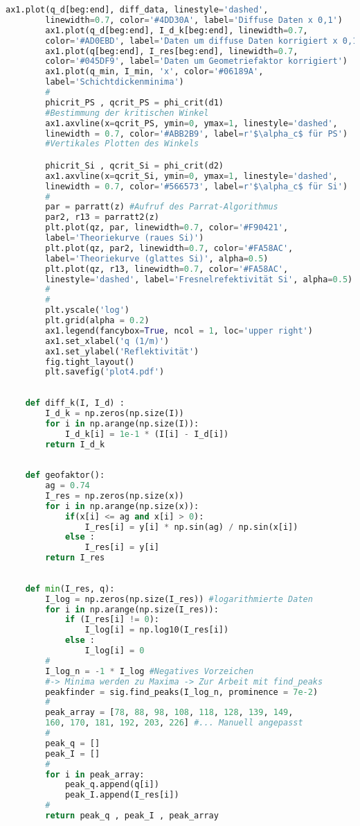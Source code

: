 \begin{lstlisting}[language=Python]
        ax1.plot(q_d[beg:end], diff_data, linestyle='dashed', 
        linewidth=0.7, color='#4DD30A', label='Diffuse Daten x 0,1')
        ax1.plot(q_d[beg:end], I_d_k[beg:end], linewidth=0.7, 
        color='#AD0EBD', label='Daten um diffuse Daten korrigiert x 0,1')
        ax1.plot(q[beg:end], I_res[beg:end], linewidth=0.7, 
        color='#045DF9', label='Daten um Geometriefaktor korrigiert')
        ax1.plot(q_min, I_min, 'x', color='#06189A', 
        label='Schichtdickenminima')
        #
        phicrit_PS , qcrit_PS = phi_crit(d1) 
        #Bestimmung der kritischen Winkel
        ax1.axvline(x=qcrit_PS, ymin=0, ymax=1, linestyle='dashed', 
        linewidth = 0.7, color='#ABB2B9', label=r'$\alpha_c$ für PS') 
        #Vertikales Plotten des Winkels

        phicrit_Si , qcrit_Si = phi_crit(d2)
        ax1.axvline(x=qcrit_Si, ymin=0, ymax=1, linestyle='dashed', 
        linewidth = 0.7, color='#566573', label=r'$\alpha_c$ für Si')
        #
        par = parratt(z) #Aufruf des Parrat-Algorithmus
        par2, r13 = parratt2(z)
        plt.plot(qz, par, linewidth=0.7, color='#F90421',
        label='Theoriekurve (raues Si)')
        plt.plot(qz, par2, linewidth=0.7, color='#FA58AC',
        label='Theoriekurve (glattes Si)', alpha=0.5)
        plt.plot(qz, r13, linewidth=0.7, color='#FA58AC',
        linestyle='dashed', label='Fresnelrefektivität Si', alpha=0.5)
        #
        #
        plt.yscale('log')
        plt.grid(alpha = 0.2)
        ax1.legend(fancybox=True, ncol = 1, loc='upper right')
        ax1.set_xlabel('q (1/m)')
        ax1.set_ylabel('Reflektivität')
        fig.tight_layout()
        plt.savefig('plot4.pdf')
    
    
    def diff_k(I, I_d) :
        I_d_k = np.zeros(np.size(I))
        for i in np.arange(np.size(I)):
            I_d_k[i] = 1e-1 * (I[i] - I_d[i])
        return I_d_k
    
    
    def geofaktor():
        ag = 0.74
        I_res = np.zeros(np.size(x))
        for i in np.arange(np.size(x)):
            if(x[i] <= ag and x[i] > 0):
                I_res[i] = y[i] * np.sin(ag) / np.sin(x[i])
            else :
                I_res[i] = y[i]
        return I_res
    
    
    def min(I_res, q):
        I_log = np.zeros(np.size(I_res)) #logarithmierte Daten
        for i in np.arange(np.size(I_res)):
            if (I_res[i] != 0):
                I_log[i] = np.log10(I_res[i])
            else :
                I_log[i] = 0
        #
        I_log_n = -1 * I_log #Negatives Vorzeichen 
        #-> Minima werden zu Maxima -> Zur Arbeit mit find_peaks
        peakfinder = sig.find_peaks(I_log_n, prominence = 7e-2)
        #
        peak_array = [78, 88, 98, 108, 118, 128, 139, 149, 
        160, 170, 181, 192, 203, 226] #... Manuell angepasst
        #
        peak_q = []
        peak_I = []
        #
        for i in peak_array:
            peak_q.append(q[i])
            peak_I.append(I_res[i])
        #
        return peak_q , peak_I , peak_array
    

\end{lstlisting}
